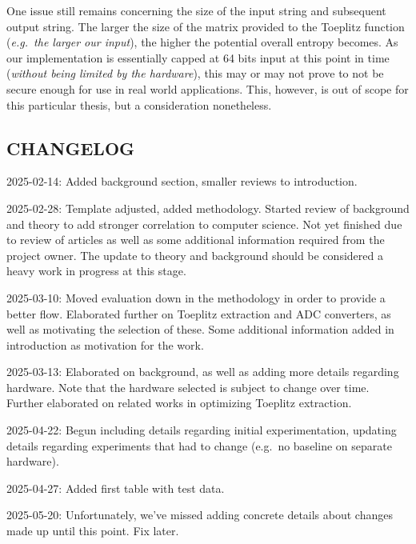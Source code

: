 One issue still remains concerning the size of the input string and subsequent output string. The larger the size of the matrix provided to the Toeplitz function (\emph{e.g.~the larger our input}), the higher the potential overall entropy becomes. As our implementation is essentially capped at 64 bits input at this point in time (\emph{without being limited by the hardware}), this may or may not prove to not be secure enough for use in real world applications. This, however, is out of scope for this particular thesis, but a consideration nonetheless.

\hypertarget{changelog}{%
\subsection{CHANGELOG}\label{changelog}}

2025-02-14: Added background section, smaller reviews to introduction.

2025-02-28: Template adjusted, added methodology. Started review of background and theory to add stronger correlation to computer science. Not yet finished due to review of articles as well as some additional information required from the project owner. The update to theory and background should be considered a heavy work in progress at this stage.

2025-03-10: Moved evaluation down in the methodology in order to provide a better flow. Elaborated further on Toeplitz extraction and ADC converters, as well as motivating the selection of these. Some additional information added in introduction as motivation for the work.

2025-03-13: Elaborated on background, as well as adding more details regarding hardware. Note that the hardware selected is subject to change over time. Further elaborated on related works in optimizing Toeplitz extraction.

2025-04-22: Begun including details regarding initial experimentation, updating details regarding experiments that had to change (e.g.~no baseline on separate hardware).

2025-04-27: Added first table with test data.

2025-05-20: Unfortunately, we've missed adding concrete details about changes made up until this point. Fix later.
